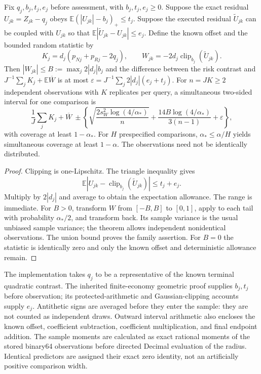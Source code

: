 \begin{proposition}\label{prop:r17-risk-certificate}
Fix $q_j,b_j,t_j,e_j$ before assessment, with $b_j,t_j,e_j\geq0$. Suppose the
exact residual $U_{jk}=Z_{jk}-q_j$ obeys
$\mathbb E(|U_{jk}|-b_j)_+\leq t_j$. Suppose the executed residual
$\widetilde U_{jk}$ can be coupled with $U_{jk}$ so that
$\mathbb E|\widetilde U_{jk}-U_{jk}|\leq e_j$.
Define the known offset and the bounded random statistic by
\[
 K_j=d_j(p_{Nj}+p_{Rj}-2q_j),\qquad
 W_{jk}=-2d_j\operatorname{clip}_{b_j}(\widetilde U_{jk}).
\]
Then $|W_{jk}|\leq B:=\max_j2|d_j|b_j$ and the difference between the
risk contrast and $J^{-1}\sum_jK_j+\mathbb E\overline W$ is at most
$\varepsilon=J^{-1}\sum_j2|d_j|(e_j+t_j)$.
For $n=JK\geq2$ independent observations with $K$ replicates per query, a
simultaneous two-sided interval for one comparison is
\begin{equation}\label{eq:r17-eb}
 \frac1J\sum_jK_j+\overline W
 \ \mathbin{\pm}\left\{
 \sqrt{\frac{2s_W^2\log(4/\alpha_*)}{n}}
 +\frac{14B\log(4/\alpha_*)}{3(n-1)}+\varepsilon\right\},
\end{equation}
with coverage at least $1-\alpha_*$. For $H$ prespecified comparisons,
$\alpha_*\leq\alpha/H$ yields simultaneous coverage at least $1-\alpha$.
The observations need not be identically distributed.
\end{proposition}
\begin{proof}
Clipping is one-Lipschitz. The triangle inequality gives
\[
 \mathbb E|U_{jk}-\operatorname{clip}_{b_j}(\widetilde U_{jk})|
 \leq t_j+e_j.
\]
Multiply by $2|d_j|$ and average to obtain the expectation allowance. The range
is immediate. For $B>0$, transform $W$ from $[-B,B]$ to $[0,1]$, apply
\citet[Theorem~11]{maurer2009} to each tail with probability
$\alpha_*/2$, and transform back. Its sample variance is the usual unbiased
sample variance; the theorem allows independent nonidentical observations.
The union bound proves the family assertion. For $B=0$ the statistic is
identically zero and only the known offset and deterministic allowance remain.
\end{proof}

The implementation takes $q_j$ to be a representative of the known terminal
quadratic contrast. The inherited finite-economy geometric proof supplies
$b_j,t_j$ before observation; its protected-arithmetic and Gaussian-clipping
accounts supply $e_j$. Antithetic signs are averaged before they enter the
sample: they are not counted as independent draws. Outward interval arithmetic
also encloses the known offset, coefficient subtraction, coefficient
multiplication, and final endpoint addition. The sample moments are calculated
as exact rational moments of the stored binary64 observations before directed
Decimal evaluation of the radius. Identical predictors are assigned their
exact zero identity, not an artificially positive comparison width.
